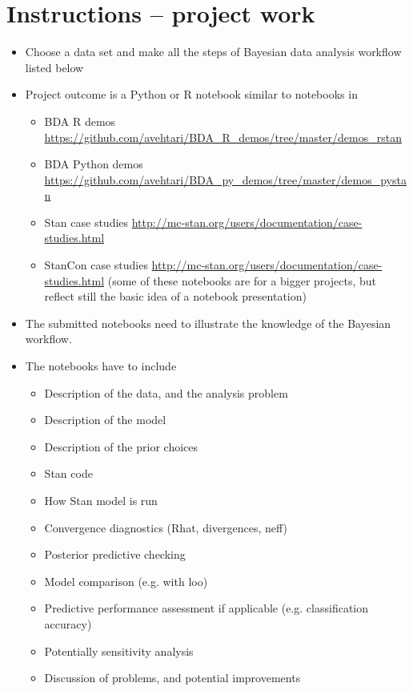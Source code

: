 \documentclass[a4paper,11pt]{article}
\begin{document}
\thispagestyle{empty}

\section*{Instructions -- project work}
\begin{itemize}[noitemsep,topsep=0pt]
\item Choose a data set and make all the steps of Bayesian data
  analysis workflow listed below
\item Project outcome is a Python or R notebook similar to notebooks in
\begin{itemize}[noitemsep,topsep=0pt]
  \item BDA R demos \url{https://github.com/avehtari/BDA_R_demos/tree/master/demos_rstan}
  \item BDA Python demos \url{https://github.com/avehtari/BDA_py_demos/tree/master/demos_pystan}
  \item Stan case studies \url{http://mc-stan.org/users/documentation/case-studies.html}
  \item StanCon case studies \url{http://mc-stan.org/users/documentation/case-studies.html}
  (some of these notebooks are for a bigger projects, but reflect still the basic idea of a notebook presentation)
\end{itemize}
\item The submitted notebooks need to illustrate the knowledge of the
  Bayesian workflow.
\item The notebooks have to include
\begin{itemize}
  \item Description of the data, and the analysis problem
  \item Description of the model
  \item Description of the prior choices
  \item Stan code
  \item How Stan model is run
  \item Convergence diagnostics (Rhat, divergences, neff)
  \item Posterior predictive checking
  \item Model comparison (e.g. with loo)
  \item Predictive performance assessment if applicable (e.g. classification
    accuracy)
  \item Potentially sensitivity analysis
  \item Discussion of problems, and potential improvements 
\end{itemize}
\end{itemize}
\end{document}
